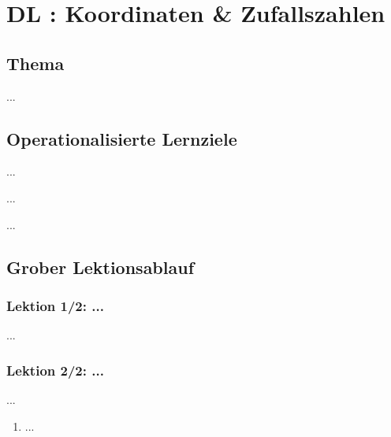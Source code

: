 \section{DL \themycounter: Koordinaten \& Zufallszahlen}
\begin{myExBox}[title=DL \themycounter]
\subsection*{Thema}
...


\subsection*{Operationalisierte Lernziele}
\begin{todolist}
    \item ...
    \item ...
    \item ...
\end{todolist}

\subsection*{Grober Lektionsablauf}
\subsubsection*{Lektion 1/2: ...}
...

\subsubsection*{Lektion 2/2: ...}
...

\begin{myExBox}[title=Mögliche Schwierigkeiten \& geeignete Massnahmen]
\begin{enumerate}
    \item ...
\end{enumerate}
\end{myExBox}
\end{myExBox}
\newpage{}

